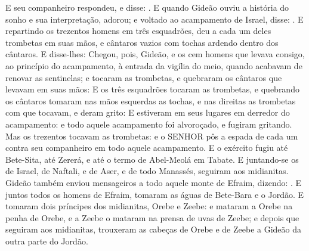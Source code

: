 {  E seu companheiro respondeu, e disse: .
  E quando Gideão ouviu a história do sonho e sua interpretação, adorou; e voltado ao acampamento de Israel, disse: .
  E repartindo os trezentos homens em três esquadrões, deu a cada um deles trombetas em suas mãos, e cântaros vazios com tochas ardendo dentro dos cântaros.
  E disse-lhes: 
  Chegou, pois, Gideão, e os cem homens que levava consigo, ao princípio do acampamento, à entrada da vigília do meio, quando acabavam de renovar as sentinelas; e tocaram as trombetas, e quebraram os cântaros que levavam em suas mãos:
  E os três esquadrões tocaram as trombetas, e quebrando os cântaros tomaram nas mãos esquerdas as tochas, e nas direitas as trombetas com que tocavam, e deram grito: 
  E estiveram em seus lugares em derredor do acampamento: e todo aquele acampamento foi alvoroçado, e fugiram gritando.
  Mas os trezentos tocavam as trombetas: e o SENHOR pôs a espada de cada um contra seu companheiro em todo aquele acampamento. E o exército fugiu até Bete-Sita, até Zererá, e até o termo de Abel-Meolá em Tabate.
  E juntando-se os de Israel, de Naftali, e de Aser, e de todo Manassés, seguiram aos midianitas.
  Gideão também enviou mensageiros a todo aquele monte de Efraim, dizendo: . E juntos todos os homens de Efraim, tomaram as águas de Bete-Bara e o Jordão.
  E tomaram dois príncipes dos midianitas, Orebe e Zeebe: e mataram a Orebe na penha de Orebe, e a Zeebe o mataram na prensa de uvas de Zeebe; e depois que seguiram aos midianitas, trouxeram as cabeças de Orebe e de Zeebe a Gideão da outra parte do Jordão.
\par }


